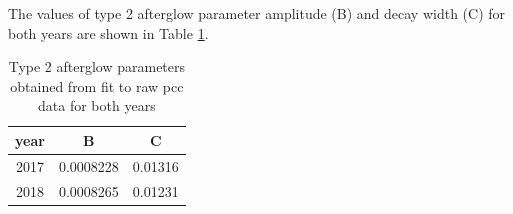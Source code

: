  The values of %
 type 2 afterglow parameter amplitude (B) and decay width (C) for both years are shown in Table \ref{fig:af_fit4000}.

\begin{table}[H]
  \centering
  \caption[Type 2 afterglow parameters estimation]{Type 2 afterglow parameters obtained from fit to raw pcc data for both years}
  \begin{tabular}{ccc}
    \textbf{year} & \textbf{B} & \textbf{C} \\
     \hline
   2017  & 0.0008228 &  0.01316\\
   2018  & 0.0008265 &  0.01231\\
  \end{tabular}
  \label{fig:af_fit4000}
\end{table}


